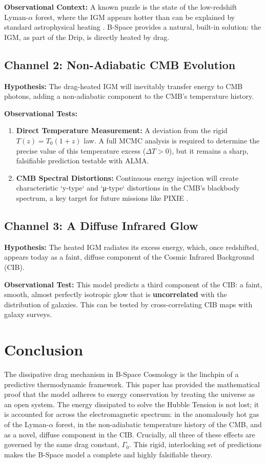 \documentclass{BSpacePaper} %
\begin{document}
\textbf{Observational Context:} A known puzzle is the state of the low-redshift Lyman-$\alpha$ forest, where the IGM appears hotter than can be explained by standard astrophysical heating \citep{McQuinn2016}. B-Space provides a natural, built-in solution: the IGM, as part of the Drip, is directly heated by drag.

\subsection{Channel 2: Non-Adiabatic CMB Evolution}
\textbf{Hypothesis:} The drag-heated IGM will inevitably transfer energy to CMB photons, adding a non-adiabatic component to the CMB's temperature history.

\textbf{Observational Tests:}
\begin{enumerate}
    \item \textbf{Direct Temperature Measurement:} A deviation from the rigid $T(z) = T_0(1+z)$ law. A full MCMC analysis is required to determine the precise value of this temperature excess ($\Delta T > 0$), but it remains a sharp, falsifiable prediction testable with ALMA.
    \item \textbf{CMB Spectral Distortions:} Continuous energy injection will create characteristic `y-type` and `μ-type` distortions in the CMB's blackbody spectrum, a key target for future missions like PIXIE \citep{Chluba2012}.
\end{enumerate}

\subsection{Channel 3: A Diffuse Infrared Glow}
\textbf{Hypothesis:} The heated IGM radiates its excess energy, which, once redshifted, appears today as a faint, diffuse component of the Cosmic Infrared Background (CIB).

\textbf{Observational Test:} This model predicts a third component of the CIB: a faint, smooth, almost perfectly isotropic glow that is \textbf{uncorrelated} with the distribution of galaxies. This can be tested by cross-correlating CIB maps with galaxy surveys.

\section{Conclusion}
The dissipative drag mechanism in B-Space Cosmology is the linchpin of a predictive thermodynamic framework. This paper has provided the mathematical proof that the model adheres to energy conservation by treating the universe as an open system. The energy dissipated to solve the Hubble Tension is not lost; it is accounted for across the electromagnetic spectrum: in the anomalously hot gas of the Lyman-$\alpha$ forest, in the non-adiabatic temperature history of the CMB, and as a novel, diffuse component in the CIB. Crucially, all three of these effects are governed by the same drag constant, $\Gamma_0$. This rigid, interlocking set of predictions makes the B-Space model a complete and highly falsifiable theory.
\end{document}
